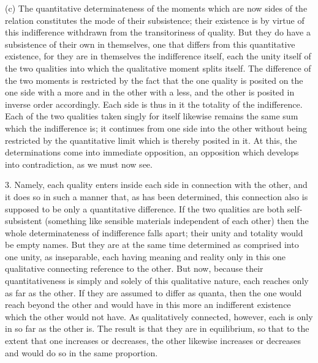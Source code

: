 (c) The quantitative determinateness of the moments which are now
sides of the relation constitutes the mode of their subsistence;
their existence is by virtue of this indifference
withdrawn from the transitoriness of quality.
But they do have a subsistence of their own in themselves,
one that differs from this quantitative existence,
for they are in themselves the indifference itself,
each the unity itself of the two qualities
into which the qualitative moment splits itself.
The difference of the two moments is restricted by
the fact that the one quality is posited
on the one side with a more
and in the other with a less,
and the other is posited
in inverse order accordingly.
Each side is thus in it the totality of the indifference.
Each of the two qualities taken singly for itself
likewise remains the same sum which the indifference is;
it continues from one side into the other
without being restricted by the quantitative limit
which is thereby posited in it.
At this, the determinations come into immediate opposition,
an opposition which develops into contradiction,
as we must now see.

3. Namely, each quality enters inside
each side in connection with the other,
and it does so in such a manner that, as has been determined,
this connection also is supposed to be only a quantitative difference.
If the two qualities are both self-subsistent
(something like sensible materials independent of each other)
then the whole determinateness of indifference falls apart;
their unity and totality would be empty names.
But they are at the same time determined as
comprised into one unity, as inseparable,
each having meaning and reality only in this one
qualitative connecting reference to the other.
But now, because their quantitativeness is simply
and solely of this qualitative nature,
 each reaches only as far as the other.
If they are assumed to differ as quanta,
then the one would reach beyond the other
and would have in this more an indifferent existence
which the other would not have.
As qualitatively connected, however,
each is only in so far as the other is.
The result is that they are in equilibrium,
so that to the extent that one increases or decreases,
the other likewise increases or decreases
and would do so in the same proportion.

